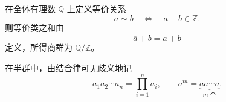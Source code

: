 \begin{example}\label{ex:rationals-mod-integers}
在全体有理数 $\mathbb Q$ 上定义等价关系
\[
  a\sim b\quad\Longleftrightarrow\quad a-b\in\mathbb Z.
\]
则等价类之和由
\[
  \overline a+\overline b=\overline{a+b}
\]
定义，所得商群为 $\mathbb Q/\mathbb Z$。
\end{example}

\begin{purplenote}
在半群中，由结合律可无歧义地记
\[
  a_1a_2\cdots a_n=\prod_{i=1}^n a_i,
  \qquad
  a^m=\underbrace{aa\cdots a}_{m\text{ 个}}.
\]
\end{purplenote}
